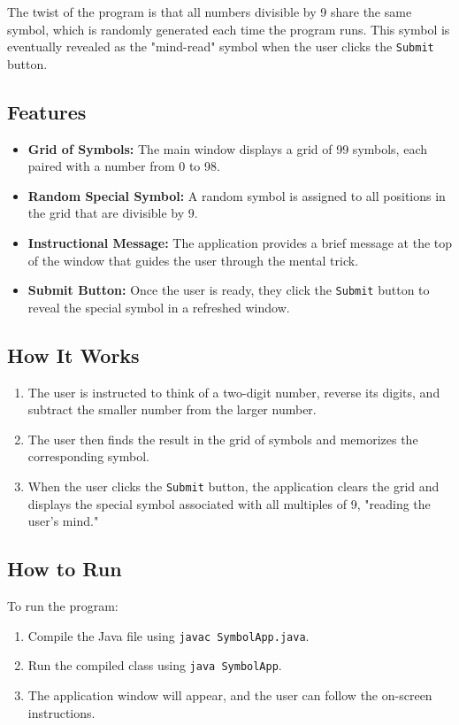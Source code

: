 \documentclass[a4paper,15pt]{article}
\begin{document}
\begin{itemize}[leftmargin=1.5cm]
The twist of the program is that all numbers divisible by 9 share the same symbol, which is randomly generated each time the program runs. This symbol is eventually revealed as the "mind-read" symbol when the user clicks the \texttt{Submit} button.

\subsection{Features}
\begin{itemize}
    \item \textbf{Grid of Symbols:} The main window displays a grid of 99 symbols, each paired with a number from 0 to 98.
    \item \textbf{Random Special Symbol:} A random symbol is assigned to all positions in the grid that are divisible by 9.
    \item \textbf{Instructional Message:} The application provides a brief message at the top of the window that guides the user through the mental trick.
    \item \textbf{Submit Button:} Once the user is ready, they click the \texttt{Submit} button to reveal the special symbol in a refreshed window.
\end{itemize}

\subsection{How It Works}
\begin{enumerate}
    \item The user is instructed to think of a two-digit number, reverse its digits, and subtract the smaller number from the larger number.
    \item The user then finds the result in the grid of symbols and memorizes the corresponding symbol.
    \item When the user clicks the \texttt{Submit} button, the application clears the grid and displays the special symbol associated with all multiples of 9, "reading the user's mind."
\end{enumerate}

\subsection{How to Run}
To run the program:
\begin{enumerate}
    \item Compile the Java file using \texttt{javac SymbolApp.java}.
    \item Run the compiled class using \texttt{java SymbolApp}.
    \item The application window will appear, and the user can follow the on-screen instructions.
\end{enumerate}


\end{itemize}
\end{document}
